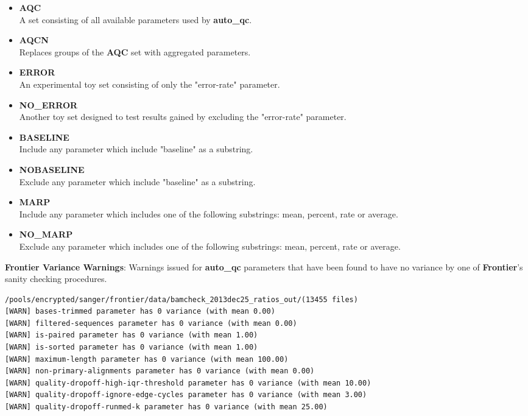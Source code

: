 \begin{itemize}
    \item \textbf{AQC} \hfill\\
        A set consisting of all available parameters used by \textbf{auto\_qc}.
    \item \textbf{AQCN} \hfill\\
        Replaces groups of the \textbf{AQC} set with aggregated parameters.
    \item \textbf{ERROR} \hfill\\
        An experimental toy set consisting of only the "error-rate" parameter.
    \item \textbf{NO\_ERROR} \hfill\\
        Another toy set designed to test results gained by excluding the
        "error-rate" parameter.
    \item \textbf{BASELINE} \hfill\\
        Include any parameter which include "baseline" as a substring.
    \item \textbf{NOBASELINE} \hfill\\
        Exclude any parameter which include "baseline" as a substring.
    \item \textbf{MARP} \hfill\\
        Include any parameter which includes one of the following substrings:
        mean, percent, rate or average.
    \item \textbf{NO\_MARP} \hfill\\
        Exclude any parameter which includes one of the following substrings:
        mean, percent, rate or average.
\end{itemize}

\begin{listing}[H]
    \caption[frontier-warnings]{\textbf{Frontier Variance Warnings}:
        Warnings issued for \textbf{auto\_qc} parameters that have been found to
        have no variance by one of \textbf{Frontier}'s sanity checking procedures.}
    \label{list:frontier-warnings}
    \begin{verbatim}
/pools/encrypted/sanger/frontier/data/bamcheck_2013dec25_ratios_out/(13455 files)
[WARN] bases-trimmed parameter has 0 variance (with mean 0.00)
[WARN] filtered-sequences parameter has 0 variance (with mean 0.00)
[WARN] is-paired parameter has 0 variance (with mean 1.00)
[WARN] is-sorted parameter has 0 variance (with mean 1.00)
[WARN] maximum-length parameter has 0 variance (with mean 100.00)
[WARN] non-primary-alignments parameter has 0 variance (with mean 0.00)
[WARN] quality-dropoff-high-iqr-threshold parameter has 0 variance (with mean 10.00)
[WARN] quality-dropoff-ignore-edge-cycles parameter has 0 variance (with mean 3.00)
[WARN] quality-dropoff-runmed-k parameter has 0 variance (with mean 25.00)
    \end{verbatim}
\end{listing}

